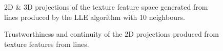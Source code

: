 \begin{figure}[H]
	\centering
	\caption{2D \& 3D projections of the texture feature space generated from lines produced by the LLE algorithm with 10 neighbours.}\label{fig:texture_LLE_mapping_lines}
\end{figure}
\clearpage


\clearpage
\begin{figure}[H]
	\centering
	\caption{Trustworthiness and continuity of the 2D projections produced from texture features from lines.}\label{fig:TC_2d_texture}
\end{figure}

